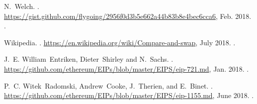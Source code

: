 \begin{thebibliography}{10}
N.~Welch.
.
\newblock
  \url{https://gist.github.com/flygoing/2956f0d3b5e662a44b83b8e4bec6cca6}, Feb.
  2018.
.

Wikipedia.
.
\newblock \url{https://en.wikipedia.org/wiki/Compare-and-swap}, July 2018.
.

J.~E. William~Entriken, Dieter~Shirley and N.~Sachs.
.
\newblock \url{https://github.com/ethereum/EIPs/blob/master/EIPS/eip-721.md},
  Jan. 2018.
.

P.~C. Witek~Radomski, Andrew~Cooke, J.~Therien, and E.~Binet.
.
\newblock \url{https://github.com/ethereum/EIPs/blob/master/EIPS/eip-1155.md},
  June 2018.
.

\end{thebibliography}
